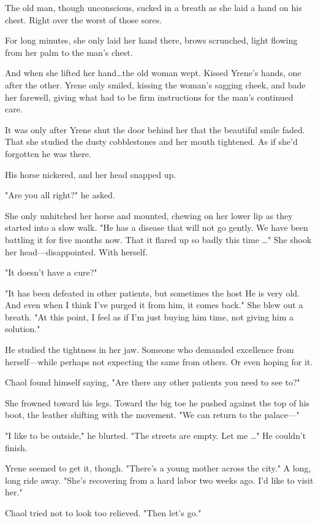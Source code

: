 The old man, though unconscious, sucked in a breath as she laid a hand on his chest.
Right over the worst of those sores.

For long minutes, she only laid her hand there, brows scrunched, light flowing from her palm to the man's chest.

And when she lifted her hand\ldots the old woman wept.
Kissed Yrene's hands, one after the other.
Yrene only smiled, kissing the woman's sagging cheek, and bade her farewell, giving what had to be firm instructions for the man's continued care.

It was only after Yrene shut the door behind her that the beautiful smile faded.
That she studied the dusty cobblestones and her mouth tightened.
As if she'd forgotten he was there.

His horse nickered, and her head snapped up.

"Are you all right?"
he asked.

She only unhitched her horse and mounted, chewing on her lower lip as they started into a slow walk.
"He has a disease that will not go gently.
We have been battling it for five months now.
That it flared up so badly this time \ldots" She shook her head---disappointed.
With herself.

"It doesn't have a cure?"

"It has been defeated in other patients, but sometimes the host  He is very old.
And even when I think I've purged it from him, it comes back."
She blew out a breath.
"At this point, I feel as if I'm just buying him time, not giving him a solution."

He studied the tightness in her jaw.
Someone who demanded excellence from herself---while perhaps not expecting the same from others.
Or even hoping for it.

Chaol found himself saying, "Are there any other patients you need to see to?"

She frowned toward his legs.
Toward the big toe he pushed against the top of his boot, the leather shifting with the movement.
"We can return to the palace---"

"I like to be outside," he blurted.
"The streets are empty.
Let me \ldots" He couldn't finish.

Yrene seemed to get it, though.
"There's a young mother across the city."
A long, long ride away.
"She's recovering from a hard labor two weeks ago.
I'd like to visit her."

Chaol tried not to look too relieved.
"Then let's go."

